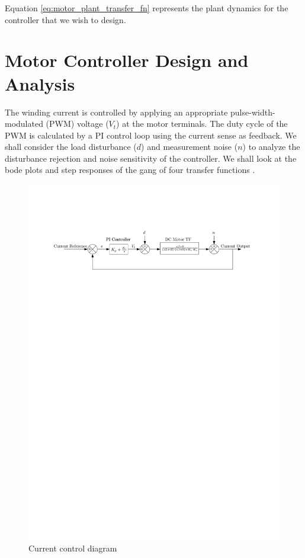 \documentclass{report}
\begin{document}
Equation \ref{eq:motor_plant_transfer_fn} represents the plant dynamics for the controller that we wish to design.

\section{Motor Controller Design and Analysis}	\label{sec:motor_control_analysis}

The winding current is controlled by applying an appropriate pulse-width-modulated (PWM) voltage ($V_t$) at the motor terminals. The duty cycle of the PWM is calculated by a PI control loop using the current sense as feedback. We shall consider the load disturbance ($d$) and measurement noise ($n$) to analyze the disturbance rejection and noise sensitivity of the controller. We shall look at the bode plots and step responses of the gang of four transfer functions \cite{gang_of_four}.

\begin{figure}
\centering
\includegraphics{motor_control_diagram}	
\caption{Current control diagram}
\label{fig:motor_control_diagram}
\end{figure}
\end{document}
